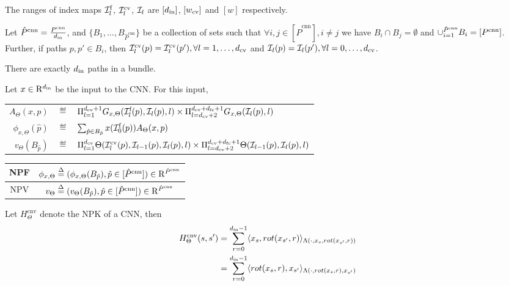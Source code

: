 \begin{notation}
The ranges of index maps $\mathcal{I}^{\text{f}}_l$,  $\mathcal{I}^{\text{cv}}_l$, $\mathcal{I}_l$ are $[d_{\text{in}}]$, $[w_{\text{cv}}]$ and $[w]$ respectively. 
\end{notation}

\begin{definition}\label{def:bundle}
Let $\hat{P}^{\text{cnn}}=\frac{P^{\text{cnn}}}{d_{\text{in}}}$, and $\{B_1,\ldots, B_{\hat{P}^{\text{cnn}}}\}$ be a collection of sets such that $\forall i,j\in [\hat{P}^{\text{cnn}}], i\neq j$ we have $B_i\cap B_j=\emptyset$ and $\cup_{i=1}^{\hat{P}^{\text{cnn}}}B_i =[P^{\text{cnn}}]$. Further,  if paths $p,p' \in B_i$, then $\mathcal{I}^{\text{cv}}_l(p)=\mathcal{I}^{\text{cv}}_l(p'), \forall l=1,\ldots, d_{\text{cv}}$ and $\mathcal{I}_l(p)=\mathcal{I}_l(p'), \forall l=0,\ldots, d_{\text{cv}}$.
\end{definition}

\begin{proposition}\label{prop:bundle}
There are exactly $d_{\text{in}}$ paths in a bundle.
\end{proposition}

\begin{definition}\label{def:convnps} Let $x\in\mathrm{R}^{d_{\text{in}}}$ be the input to the CNN. For this input, 
\begin{tabular}{rlp{4cm}}
$A_{\Theta}(x,p)$&$\eqdef$&$\Pi_{l=1}^{d_{\text{cv}}+1} G_{x,\Theta}(\mathcal{I}^{\text{f}}_l(p),\mathcal{I}_l(p),l)\times\Pi_{l=d_{\text{cv}}+2}^{d_{\text{cv}}+d_{\text{fc}}+1} G_{x,\Theta}(\mathcal{I}_l(p),l)$\\
$\phi_{x,\Theta}(\hat{p})$&$\eqdef$&$ \sum_{\hat{p}\in B_{\hat{p}}}x(\mathcal{I}^{\text{f}}_0(p))A_{\Theta}(x,p)$\\
$v_{\Theta}(B_{\hat{p}})$&$\eqdef$&$ \Pi_{l=1}^{d_{\text{cv}}} \Theta(\mathcal{I}^{\text{cv}}_{l}(p),\mathcal{I}_{l-1}(p),\mathcal{I}_{l}(p),l) \times \Pi_{l=d_{\text{cv}}+2}^{d_{\text{cv}}+d_{\text{fc}}+1} \Theta(\mathcal{I}_{l-1}(p),\mathcal{I}_l(p),l)$ 
\end{tabular}
\begin{center}
\begin{tabular}{|c|c|}\hline
NPF &$\phi_{x,\Theta}\stackrel{\Delta}{=} (\phi_{x,\Theta}(B_{\hat{p}}),\hat{p}\in [\hat{P}^{\text{cnn}}])\in\mathrm{R}^{\hat{P}^{\text{cnn}}}$\\\hline
NPV& $v_{\Theta}\stackrel{\Delta}{=} (v_{\Theta}(B_{\hat{p}}),\hat{p}\in [\hat{P}^{\text{cnn}}])\in\mathrm{R}^{\hat{P}^{\text{cnn}}}$\\\hline
\end{tabular}
\end{center}
\end{definition}

\begin{lemma}\label{lm:cnnnpk}
Let $H^{\text{cnv}}_{\Theta}$ denote the NPK of a CNN, then 
\begin{align*}
H^{\text{cnv}}_{\Theta}(s,s')&=\sum_{r=0}^{d_{\text{in}}-1} \langle x_s,rot(x_{s'},r)\rangle_{\Lambda(\cdot, x_s,rot(x_{s'},r))}\\&=\sum_{r=0}^{d_{\text{in}}-1} \langle rot(x_s,r),x_{s'}\rangle_{\Lambda(\cdot, rot(x_s,r),x_{s'})}
\end{align*}
\end{lemma}

